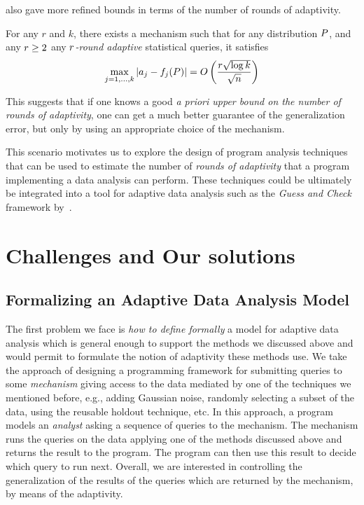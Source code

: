 \citet{DworkFHPRR15}
also gave more refined bounds in terms of the number of rounds of adaptivity.   %
\begin{thm} \label{thm:gaussiannoise2} For any $r$ and $k$, there exists a mechanism such that for any distribution $P$, and any $r \geq 2$ any \emph{$r$-round adaptive} statistical queries, it satisfies
$$
\max_{j=1,\dots,k} | a_j - f_j(P) | = O\left( \frac{r \sqrt{\log k}}{\sqrt{n}}  \right)
$$
\end{thm}

This suggests that if one knows a good \emph{a priori upper bound on the number of rounds of adaptivity}, one can get a much better guarantee of the generalization error, but only by using an appropriate choice of the mechanism.




This scenario motivates us to explore the design of program analysis techniques that can be used to estimate the number of \emph{rounds of adaptivity} that a program implementing a data analysis can perform. These techniques could be ultimately be integrated into a tool for adaptive data analysis such as the \emph{Guess and Check} framework by~\citet{RogersRSSTW20}. 
%

\section{Challenges and Our solutions }
\label{sec:adapt-challenges}

\subsection{Formalizing an Adaptive Data Analysis Model}
\label{subsec:adapt-formalizing-model}
The first problem we face is \emph{how to define formally} a model for adaptive data analysis which is general enough to support the methods we discussed above and would permit to formulate the notion of adaptivity these methods use. We take the approach of designing a programming framework for submitting queries to some \emph{mechanism} giving access to the data mediated by one of the techniques we mentioned before, e.g., adding Gaussian noise, randomly selecting a subset of the data, using the reusable holdout technique, etc. In this approach, a program models an \emph{analyst} asking a sequence of queries to the mechanism. The mechanism runs the queries on the data applying one of the methods discussed above and returns the result to the program. The program can then use this result to decide which query to run next. Overall, we are interested in controlling the generalization of the results of the queries which are returned by the mechanism, by means of the adaptivity. 

